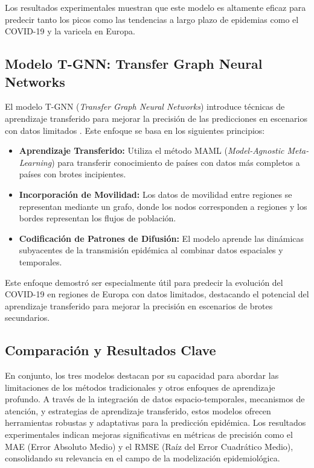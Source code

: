 Los resultados experimentales muestran que este modelo es altamente eficaz para predecir tanto los picos como las tendencias a largo plazo de epidemias como el COVID-19 y la varicela en Europa.

\subsection{Modelo T-GNN: Transfer Graph Neural Networks}

El modelo T-GNN (\textit{Transfer Graph Neural Networks}) introduce técnicas de aprendizaje transferido para mejorar la precisión de las predicciones en escenarios con datos limitados \cite{173}. Este enfoque se basa en los siguientes principios:

\begin{itemize}
    \item \textbf{Aprendizaje Transferido:} Utiliza el método MAML (\textit{Model-Agnostic Meta-Learning}) para transferir conocimiento de países con datos más completos a países con brotes incipientes.
    \item \textbf{Incorporación de Movilidad:} Los datos de movilidad entre regiones se representan mediante un grafo, donde los nodos corresponden a regiones y los bordes representan los flujos de población.
    \item \textbf{Codificación de Patrones de Difusión:} El modelo aprende las dinámicas subyacentes de la transmisión epidémica al combinar datos espaciales y temporales.
\end{itemize}

Este enfoque demostró ser especialmente útil para predecir la evolución del COVID-19 en regiones de Europa con datos limitados, destacando el potencial del aprendizaje transferido para mejorar la precisión en escenarios de brotes secundarios.

\subsection{Comparación y Resultados Clave}

En conjunto, los tres modelos destacan por su capacidad para abordar las limitaciones de los métodos tradicionales y otros enfoques de aprendizaje profundo. A través de la integración de datos espacio-temporales, mecanismos de atención, y estrategias de aprendizaje transferido, estos modelos ofrecen herramientas robustas y adaptativas para la predicción epidémica. Los resultados experimentales indican mejoras significativas en métricas de precisión como el MAE (Error Absoluto Medio) y el RMSE (Raíz del Error Cuadrático Medio), consolidando su relevancia en el campo de la modelización epidemiológica.
